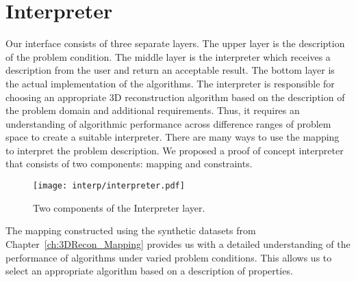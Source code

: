


\section{Interpreter}
\label{sec:interp}
Our interface consists of three separate layers. The upper layer is the description of the problem condition. The middle layer is the interpreter which receives a description from the user and return an acceptable result. The bottom layer is the actual implementation of the algorithms. The interpreter is responsible for choosing an appropriate 3D reconstruction algorithm based on the description of the problem domain and additional requirements. Thus, it requires an understanding of algorithmic performance across difference ranges of problem space to create a suitable interpreter. There are many ways to use the mapping to interpret the problem description. We proposed a proof of concept interpreter that consists of two components: mapping and constraints.
\begin{figure}[!htbp]
\centering
\texttt{[image: interp/interpreter.pdf]}
\caption{Two components of the Interpreter layer.}
\label{fig:interpreter_layer}
\end{figure}

The mapping constructed using the synthetic datasets from Chapter~\ref{ch:3DRecon_Mapping} provides us with a detailed understanding of the performance of algorithms under varied problem conditions. This allows us to select an appropriate algorithm based on a description of properties.

